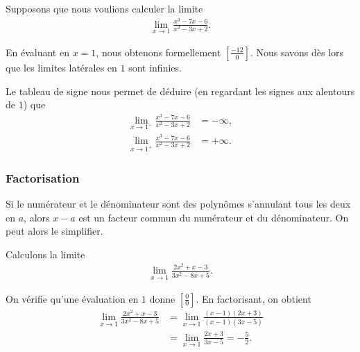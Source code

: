\documentclass[main.tex]{subfiles}
\begin{document}
\begin{example}

    Supposons que nous voulions calculer la limite
    \begin{align}
        \lim_{x \to 1} \frac {x^3 - 7x - 6} {x^2 - 3x + 2}.
    \end{align}

    En évaluant en $x = 1$,
    nous obtenons formellement $\left[\frac {-12} {0}\right]$.
    Nous savons dès lors que les limites latérales en $1$ sont infinies.

    Le tableau de signe
    nous permet de déduire (en regardant les signes aux alentours de $1$) que
    \begin{align}
        \lim_{x \to 1^-} \frac {x^3 - 7x - 6} {x^2 - 3x + 2} &= -\infty,\\
        \lim_{x \to 1^+} \frac {x^3 - 7x - 6} {x^2 - 3x + 2} &= +\infty.
    \end{align}
\end{example}

\subsubsection{Factorisation}

Si le numérateur et le dénominateur sont des polynômes s'annulant tous les deux en $a$,
alors $x - a$ est un facteur commun du numérateur et du dénominateur.
On peut alors le simplifier.

\begin{example}

    Calculons la limite
    \begin{align}
        \lim_{x \to 1} \frac {2x^2 + x - 3} {3x^2 - 8x + 5}.
    \end{align}

    On vérifie qu'une évaluation en $1$ donne $[\frac 0 0]$.
    En factorisant, on obtient
    \begin{align}
        \lim_{x \to 1} \frac {2x^2 + x - 3} {3x^2 - 8x + 5}
        &= \lim_{x \to 1} \frac {(x - 1)(2x + 3)} {(x - 1)(3x - 5)}\\
        &= \lim_{x \to 1} \frac {2x + 3} {3x - 5} = - \frac 5 2.
    \end{align}
\end{example}
\end{document}
